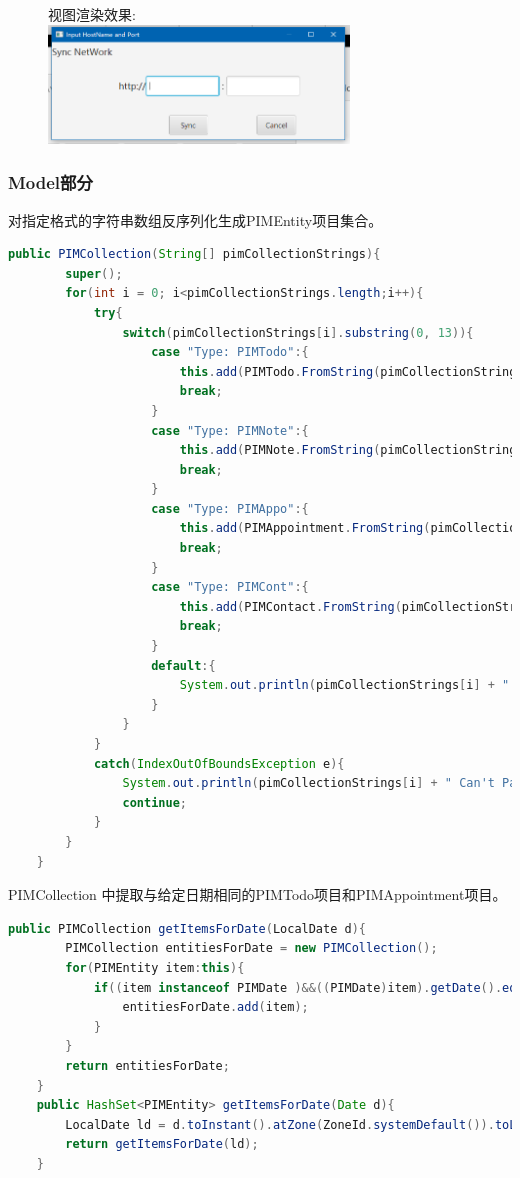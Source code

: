 \documentclass[a4paper]{article}
\begin{document}
        \begin{figure}[H]
            视图渲染效果:\\
            \centering
            \includegraphics[width=8cm]{s3.png}\\
        \end{figure}
    \subsubsection{Model部分}
    对指定格式的字符串数组反序列化生成PIMEntity项目集合。
    \begin{lstlisting}[language=Java]
    public PIMCollection(String[] pimCollectionStrings){
        super();
        for(int i = 0; i<pimCollectionStrings.length;i++){
            try{
                switch(pimCollectionStrings[i].substring(0, 13)){
                    case "Type: PIMTodo":{
                        this.add(PIMTodo.FromString(pimCollectionStrings[i]));
                        break;
                    }
                    case "Type: PIMNote":{
                        this.add(PIMNote.FromString(pimCollectionStrings[i]));
                        break;
                    }
                    case "Type: PIMAppo":{
                        this.add(PIMAppointment.FromString(pimCollectionStrings[i]));
                        break;
                    }
                    case "Type: PIMCont":{
                        this.add(PIMContact.FromString(pimCollectionStrings[i]));
                        break;
                    }
                    default:{
                        System.out.println(pimCollectionStrings[i] + " Can't Parse");
                    }
                }
            }
            catch(IndexOutOfBoundsException e){
                System.out.println(pimCollectionStrings[i] + " Can't Parse");
                continue;
            }
        }
    }
    \end{lstlisting}

    PIMCollection 中提取与给定日期相同的PIMTodo项目和PIMAppointment项目。
    \begin{lstlisting}[language=Java]
    public PIMCollection getItemsForDate(LocalDate d){
        PIMCollection entitiesForDate = new PIMCollection();
        for(PIMEntity item:this){
            if((item instanceof PIMDate )&&((PIMDate)item).getDate().equals(d)){
                entitiesForDate.add(item);
            }
        }
        return entitiesForDate;
    }
    public HashSet<PIMEntity> getItemsForDate(Date d){
        LocalDate ld = d.toInstant().atZone(ZoneId.systemDefault()).toLocalDate();
        return getItemsForDate(ld);
    }
    \end{lstlisting}
\end{document}
